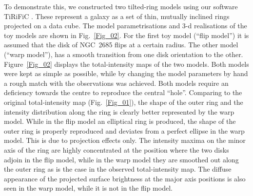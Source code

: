 \documentclass[oldversion]{aa}
\begin{document}
To demonstrate this, we constructed two tilted-ring models using our
software TiRiFiC \citep[][ hereafter Paper I]{Jozsa07a}. These
represent a galaxy as a set of thin, mutually inclined rings projected
on a data cube. The model parametrisations and 3-d realisations of the
toy models are shown in Fig.~\ref{Fig_02}. For the first toy model
(``flip model'') it is assumed that the  disk of NGC~2685
flips at a certain radius. The other model (``warp model''), has a
smooth transition from one disk orientation to the
other. Figure~\ref{Fig_02} displays the total-intensity maps of the
two models. Both models were kept as simple as possible, while by
changing the model parameters by hand a rough match with the
observations was achieved. Both models require an
 deficiency towards the centre to reproduce the central
 ``hole''. Comparing to the original total-intensity map
(Fig.~\ref{Fig_01}), the shape of the outer ring and the intensity
distribution along the ring is clearly better represented by the warp
model. While in the flip model an elliptical ring is produced, the
shape of the outer ring is properly reproduced and deviates from a
perfect ellipse in the warp model. This is due to projection effects
only. The intensity maxima on the minor axis of the ring are highly
concentrated at the position where the two disks adjoin in the flip
model, while in the warp model they are smoothed out along the outer
ring as is the case in the observed total-intensity map. The diffuse
appearance of the projected surface brightness at the major axis
positions is also seen in the warp model, while it is not in the flip
model.
\end{document}
